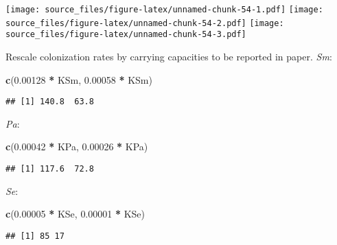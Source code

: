 \documentclass[]{article}
\newenvironment{Shaded}{\begin{snugshade}}{\end{snugshade}}
\newcommand{\KeywordTok}[1]{\textcolor[rgb]{0.13,0.29,0.53}{\textbf{#1}}}
\newcommand{\FloatTok}[1]{\textcolor[rgb]{0.00,0.00,0.81}{#1}}
\newcommand{\StringTok}[1]{\textcolor[rgb]{0.31,0.60,0.02}{#1}}
\newcommand{\OperatorTok}[1]{\textcolor[rgb]{0.81,0.36,0.00}{\textbf{#1}}}
\newcommand{\NormalTok}[1]{#1}
\begin{document}
\texttt{[image: source\_files/figure-latex/unnamed-chunk-54-1.pdf]}
\texttt{[image: source\_files/figure-latex/unnamed-chunk-54-2.pdf]}
\texttt{[image: source\_files/figure-latex/unnamed-chunk-54-3.pdf]}

Rescale colonization rates by carrying capacities to be reported in
paper. \emph{Sm}:

\begin{Shaded}
\begin{Highlighting}[]
\KeywordTok{c}\NormalTok{(}\FloatTok{0.00128} \OperatorTok{*}\StringTok{ }\NormalTok{KSm, }\FloatTok{0.00058} \OperatorTok{*}\StringTok{ }\NormalTok{KSm)}
\end{Highlighting}
\end{Shaded}

\begin{verbatim}
## [1] 140.8  63.8
\end{verbatim}

\emph{Pa}:

\begin{Shaded}
\begin{Highlighting}[]
\KeywordTok{c}\NormalTok{(}\FloatTok{0.00042} \OperatorTok{*}\StringTok{ }\NormalTok{KPa, }\FloatTok{0.00026} \OperatorTok{*}\StringTok{ }\NormalTok{KPa)}
\end{Highlighting}
\end{Shaded}

\begin{verbatim}
## [1] 117.6  72.8
\end{verbatim}

\emph{Se}:

\begin{Shaded}
\begin{Highlighting}[]
\KeywordTok{c}\NormalTok{(}\FloatTok{0.00005} \OperatorTok{*}\StringTok{ }\NormalTok{KSe, }\FloatTok{0.00001} \OperatorTok{*}\StringTok{ }\NormalTok{KSe)}
\end{Highlighting}
\end{Shaded}

\begin{verbatim}
## [1] 85 17
\end{verbatim}
\end{document}
